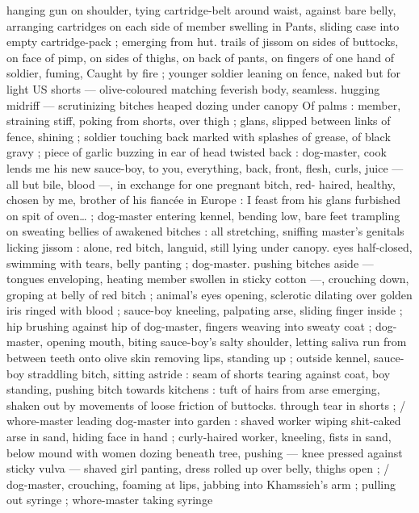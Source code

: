 hanging gun on shoulder, tying cartridge-belt around waist, against 
bare belly, arranging cartridges on each side of member swelling in 
Pants, sliding case into empty cartridge-pack ; emerging from hut. 
trails of jissom on sides of buttocks, on face of pimp, on sides of 
thighs, on back of pants, on fingers of one hand of soldier, fuming, 
Caught by fire ; younger soldier leaning on fence, naked but for light 
US shorts --- olive-coloured matching feverish body, seamless. 
hugging midriff --- scrutinizing bitches heaped dozing under canopy 
Of palms : member, straining stiff, poking from shorts, over thigh ; 
glans, slipped between links of fence, shining ; soldier touching back 
marked with splashes of grease, of black gravy ; piece of garlic 
buzzing in ear of head twisted back : {\gl}{\td} dog-master, cook lends me 
his new sauce-boy, to you, everything, back, front, flesh, curls, juice 
--- all but bile, blood ---, in exchange for one pregnant bitch, red- 
haired, healthy, chosen by me, brother of his fiancée in Europe : I 
feast from his glans furbished on spit of oven{\ldots} {\gr} ; dog-master 
entering kennel, bending low, bare feet trampling on sweating bellies 
of awakened bitches : all stretching, sniffing master's genitals 
licking jissom : alone, red bitch, languid, still lying under canopy. 
eyes half-closed, swimming with tears, belly panting ; dog-master. 
pushing bitches aside --- tongues enveloping, heating member 
swollen in sticky cotton ---, crouching down, groping at belly of red 
bitch ; animal's eyes opening, sclerotic dilating over golden iris 
ringed with blood ; sauce-boy kneeling, palpating arse, sliding finger 
inside ; hip brushing against hip of dog-master, fingers weaving into 
sweaty coat ; dog-master, opening mouth, biting sauce-boy's salty 
shoulder, letting saliva run from between teeth onto olive skin 
removing lips, standing up ; outside kennel, sauce-boy straddling 
bitch, sitting astride : seam of shorts tearing against coat, boy 
standing, pushing bitch towards kitchens : tuft of hairs from arse 
emerging, shaken out by movements of loose friction of buttocks. 
through tear in shorts ; {\slash} whore-master leading dog-master into 
garden : shaved worker wiping shit-caked arse in sand, hiding face 
in hand ; curly-haired worker, kneeling, fists in sand, below mound 
with women dozing beneath tree, pushing --- knee pressed against 
sticky vulva --- shaved girl panting, dress rolled up over belly, thighs 
open ; {\slash} dog-master, crouching, foaming at lips, jabbing into 
Khamssieh's arm ; pulling out syringe ; whore-master taking syringe 

